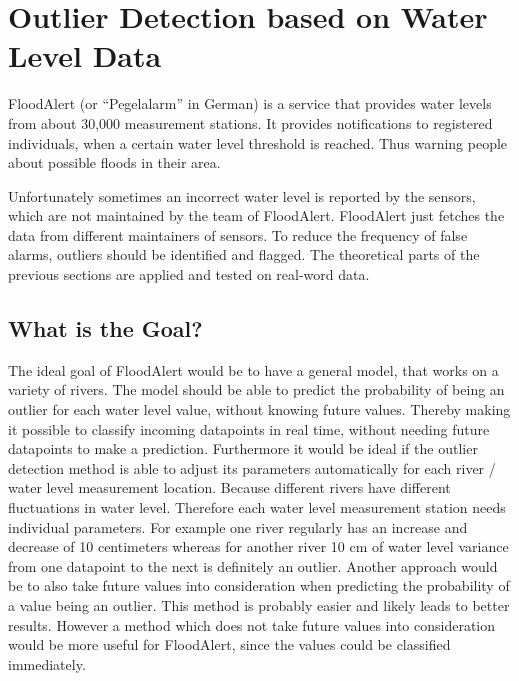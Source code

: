 \chapter{Outlier Detection based on Water Level Data}
FloodAlert (or ``Pegelalarm'' in German) is a service that provides water levels from about 30,000 measurement stations. It provides notifications to registered individuals, when a certain water level threshold is reached. Thus warning people about possible floods in their area. \cite{strassmayrFloodAlertWaterLevels}


Unfortunately sometimes an incorrect water level is reported by the sensors, which are not maintained by the team of FloodAlert. FloodAlert just fetches the data from different maintainers of sensors. To reduce the frequency of false alarms, outliers should be identified and flagged. The theoretical parts of the previous sections are applied and tested on real-word data.
\section{What is the Goal?}
The ideal goal of FloodAlert would be to have a general model, that works on a variety of rivers. The model should be able to predict the probability of being an outlier for each water level value, without knowing future values. Thereby making it possible to classify incoming datapoints in real time, without needing future datapoints to make a prediction. Furthermore it would be ideal if the outlier detection method is able to adjust its parameters automatically for each river / water level measurement location. Because different rivers have different fluctuations in water level. Therefore each water level measurement station needs individual parameters. For example one river regularly has an increase and decrease of 10 centimeters whereas for another river 10 cm of water level variance from one datapoint to the next is definitely an outlier.
\newline
\newline
Another approach would be to also take future values into consideration when predicting the probability of a value being an outlier. This method is probably easier and likely leads to better results. However a method which does not take future values into consideration would be more useful for FloodAlert, since the values could be classified immediately.

